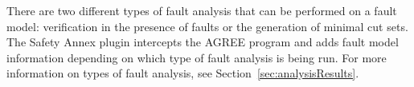 There are two different types of fault analysis that can be performed on a fault model: verification in the presence of faults or the generation of minimal cut sets. The Safety Annex plugin intercepts the AGREE program and adds fault model information depending on which type of fault analysis is being run. For more information on types of fault analysis, see Section~\ref{sec:analysisResults}.

